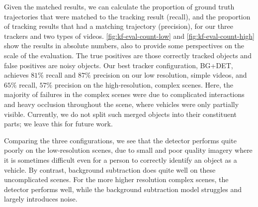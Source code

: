 Given the matched results, we can calculate the proportion of ground truth trajectories that were matched to the tracking result (recall), and the proportion of tracking results that had a matching trajectory (precision), for our three trackers and two types of videos. 
\ref{fig:kf-eval-count-low} and \ref{fig:kf-eval-count-high} show the results in absolute numbers, also to provide some perspectives on the scale of the evaluation. The true positives are those correctly tracked objects and false positives are noisy objects. Our best tracker configuration, BG+DET, achieves $81\%$ recall and $87\%$ precision on our low resolution, simple videos, and $65\%$ recall, $57\%$ precision on the high-resolution, complex scenes. Here, the majority of failures in the complex scenes were due to complicated interactions and heavy occlusion throughout the scene, where vehicles were only partially visible. Currently, we do not split such merged objects into their constituent parts; we leave this for future work. 

Comparing the three configurations, we see that the detector performs quite poorly on the low-resolution scenes, due to small and poor quality imagery where it is sometimes difficult even for a person to correctly identify an object as a vehicle. By contrast, background subtraction does quite well on these uncomplicated scenes. For the more higher resolution complex scenes, the detector performs well, while the background subtraction model struggles and largely introduces noise.

